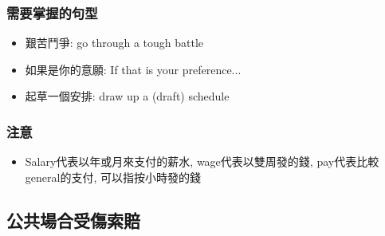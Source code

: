 \subsubsection*{需要掌握的句型}
\begin{multicols}{2}
\begin{itemize}
  \itemsep0em
  \item 艱苦鬥爭: go through a tough battle
  \item 如果是你的意願: If that is your preference...
  \item 起草一個安排: draw up a (draft) schedule
\end{itemize}
\end{multicols}

\subsubsection*{注意}
\begin{itemize}
  \itemsep0em
  \item Salary代表以年或月來支付的薪水, wage代表以雙周發的錢, pay代表比較general的支付, 可以指按小時發的錢
\end{itemize}

\subsection{公共場合受傷索賠}
